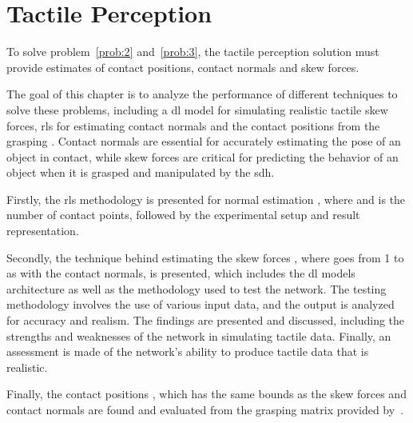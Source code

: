 \chapter{Tactile Perception}\label{ch:1-tactile-perception}


To solve problem~\ref{prob:2} and~\ref{prob:3}, the tactile perception solution must provide estimates of contact positions, contact normals and skew forces. \medskip

The goal of this chapter is to analyze the performance of different techniques to solve these problems, including a \gls{dl} model for simulating realistic tactile skew forces, \gls{rls} for estimating contact normals and the contact positions from the grasping . Contact normals are essential for accurately estimating the pose of an object in contact, while skew forces are critical for predicting the behavior of an object when it is grasped and manipulated by the \gls{sdh}. \medskip

Firstly, the \gls{rls} methodology is presented for normal estimation , where  and  is the number of contact points, followed by the experimental setup and result representation.\medskip

Secondly, the technique behind estimating the skew forces , where  goes from \num{1} to  as with the contact normals, is presented, which includes the \gls{dl} models architecture as well as the methodology used to test the network. The testing methodology involves the use of various input data, and the output is analyzed for accuracy and realism. The findings are presented and discussed, including the strengths and weaknesses of the network in simulating tactile data. Finally, an assessment is made of the network's ability to produce tactile data that is realistic. \medskip

Finally, the contact positions , which has the same bounds as the skew forces and contact normals are found and evaluated from the grasping matrix  provided by~\cite{simulation-of-the-syntouch-biotac-sensor}.\medskip

